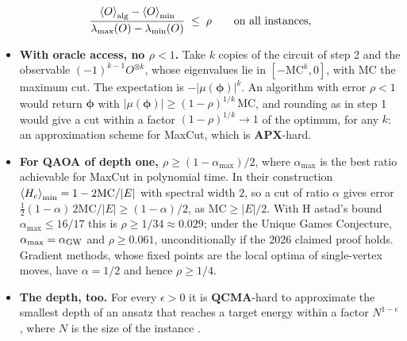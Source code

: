 \documentclass[handoutsbeamer.tex]{subfiles}
\begin{document}
\begin{frame}
\onp{\scriptsize}
\begin{equation}\label{eq:ch03:rho}
    \frac{\braket{O}_{\rm alg} - \braket{O}_{\min}}{\lambda_{\max}(O) - \lambda_{\min}(O)} \;\le\; \rho \qquad\text{on all instances,}
\end{equation}
\begin{itemize}\setlength\itemsep{0.25em}
    \item \textbf{With oracle access, no $\rho < 1$.} Take $k$ copies of the circuit of step 2 and the observable $(-1)^{k-1}O^{\otimes k}$, whose eigenvalues lie in $[-\mathrm{MC}^k,0]$, with $\mathrm{MC}$ the maximum cut. The expectation is $-|\mu(\boldsymbol\phi)|^k$. An algorithm with error $\rho<1$ would return $\boldsymbol\phi$ with $|\mu(\boldsymbol\phi)| \ge (1-\rho)^{1/k}\,\mathrm{MC}$, and rounding as in step 1 would give a cut within a factor $(1-\rho)^{1/k} \to 1$ of the optimum, for any $k$: an approximation scheme for MaxCut, which is $\mathbf{APX}$-hard.
    \item \textbf{For QAOA of depth one, $\rho \ge (1-\alpha_{\max})/2$}, where $\alpha_{\max}$ is the best ratio achievable for MaxCut in polynomial time. In their construction $\braket{H_c}_{\min} = 1 - 2\mathrm{MC}/|E|$ with spectral width $2$, so a cut of ratio $\alpha$ gives error $\tfrac12(1-\alpha)\,2\mathrm{MC}/|E| \ge (1-\alpha)/2$, as $\mathrm{MC}\ge|E|/2$. With H astad's bound $\alpha_{\max} \le 16/17$ this is $\rho \ge 1/34 \approx 0.029$; under the Unique Games Conjecture, $\alpha_{\max} = \alpha_{\rm GW}$ and $\rho \ge 0.061$, unconditionally if the 2026 claimed proof holds. Gradient methods, whose fixed points are the local optima of single-vertex moves, have $\alpha = 1/2$ and hence $\rho \ge 1/4$.
    \item \textbf{The depth, too.} For every $\epsilon>0$ it is $\mathbf{QCMA}$-hard to approximate the smallest depth of an ansatz that reaches a target energy within a factor $N^{1-\epsilon}$, where $N$ is the size of the instance \citep{bittelQCMA}.
\end{itemize}
\end{frame}
\end{document}
